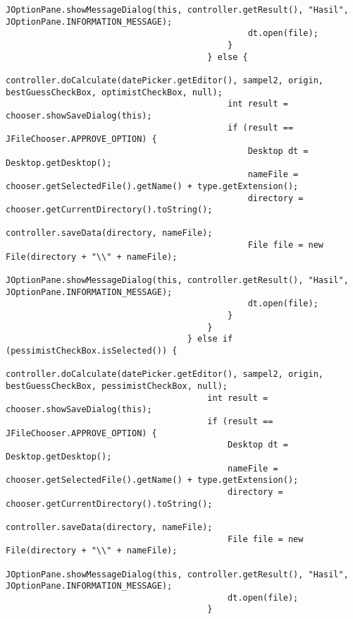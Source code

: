 \begin{lstlisting}[caption= main.java]
                                                JOptionPane.showMessageDialog(this, controller.getResult(), "Hasil", JOptionPane.INFORMATION_MESSAGE);
                                                dt.open(file);
                                            }
                                        } else {
                                            controller.doCalculate(datePicker.getEditor(), sampel2, origin, bestGuessCheckBox, optimistCheckBox, null);
                                            int result = chooser.showSaveDialog(this);
                                            if (result == JFileChooser.APPROVE_OPTION) {
                                                Desktop dt = Desktop.getDesktop();
                                                nameFile = chooser.getSelectedFile().getName() + type.getExtension();
                                                directory = chooser.getCurrentDirectory().toString();
                                                controller.saveData(directory, nameFile);
                                                File file = new File(directory + "\\" + nameFile);
                                                JOptionPane.showMessageDialog(this, controller.getResult(), "Hasil", JOptionPane.INFORMATION_MESSAGE);
                                                dt.open(file);
                                            }
                                        }
                                    } else if (pessimistCheckBox.isSelected()) {
                                        controller.doCalculate(datePicker.getEditor(), sampel2, origin, bestGuessCheckBox, pessimistCheckBox, null);
                                        int result = chooser.showSaveDialog(this);
                                        if (result == JFileChooser.APPROVE_OPTION) {
                                            Desktop dt = Desktop.getDesktop();
                                            nameFile = chooser.getSelectedFile().getName() + type.getExtension();
                                            directory = chooser.getCurrentDirectory().toString();
                                            controller.saveData(directory, nameFile);
                                            File file = new File(directory + "\\" + nameFile);
                                            JOptionPane.showMessageDialog(this, controller.getResult(), "Hasil", JOptionPane.INFORMATION_MESSAGE);
                                            dt.open(file);
                                        }

\end{lstlisting}
